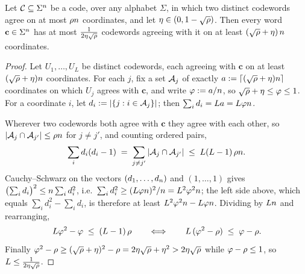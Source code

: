 \begin{theorem}\label{thm:johnson-general}
Let $\mathcal{C} \subseteq \Sigma^n$ be a code, over any alphabet $\Sigma$, in which two distinct codewords agree on at most $\rho n$ coordinates, and let $\eta \in (0, 1 - \sqrt{\rho})$. Then every word $\mathbf{c} \in \Sigma^n$ has at most $\tfrac{1}{2\eta\sqrt{\rho}}$ codewords agreeing with it on at least $(\sqrt{\rho} + \eta)\, n$ coordinates.
\end{theorem}

\begin{proof}
Let $U_1, \dots, U_L$ be distinct codewords, each agreeing with $\mathbf{c}$ on at least $(\sqrt{\rho}+\eta) n$ coordinates. For each $j$, fix a set $\mathcal{A}_j$ of exactly $a := \lceil (\sqrt{\rho}+\eta) n \rceil$ coordinates on which $U_j$ agrees with $\mathbf{c}$, and write $\varphi := a/n$, so $\sqrt{\rho} + \eta \le \varphi \le 1$. For a coordinate $i$, let $d_i := |\{ j : i \in \mathcal{A}_j \}|$; then $\sum_i d_i = L a = L \varphi n$.

Wherever two codewords both agree with $\mathbf{c}$ they agree with each other, so $|\mathcal{A}_j \cap \mathcal{A}_{j'}| \le \rho n$ for $j \neq j'$, and counting ordered pairs,
\[
\sum_i d_i (d_i - 1) \;=\; \sum_{j \neq j'} |\mathcal{A}_j \cap \mathcal{A}_{j'}| \;\le\; L(L-1)\, \rho n .
\]
Cauchy--Schwarz on the vectors $(d_1, \dots, d_n)$ and $(1, \dots, 1)$ gives $\bigl(\sum_i d_i\bigr)^2 \le n \sum_i d_i^2$, i.e.\ $\sum_i d_i^2 \ge (L \varphi n)^2 / n = L^2 \varphi^2 n$; the left side above, which equals $\sum_i d_i^2 - \sum_i d_i$, is therefore at least $L^2 \varphi^2 n - L \varphi n$. Dividing by $Ln$ and rearranging,
\[
L \varphi^2 - \varphi \;\le\; (L-1)\, \rho
\qquad\Longleftrightarrow\qquad
L\, (\varphi^2 - \rho) \;\le\; \varphi - \rho .
\]
Finally $\varphi^2 - \rho \ge (\sqrt{\rho}+\eta)^2 - \rho = 2\eta\sqrt{\rho} + \eta^2 > 2\eta\sqrt{\rho}$ while $\varphi - \rho \le 1$, so $L \le \tfrac{1}{2\eta\sqrt{\rho}}$.
\end{proof}
